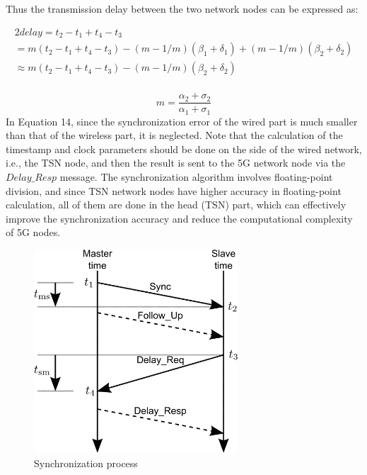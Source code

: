 \documentclass[english]{cccconf}
\begin{document}
Thus the transmission delay between the two network nodes can be expressed as:

	\begin{equation}
		\begin{gathered}
			2  delay =t_{2}-t_{1}+t_{4}-t_{3} \\
			=m\left(t_{2}-t_{1}+t_{4}-t_{3}\right)-(m-1 / m)\left(\beta_{1}+\delta_{1}\right)+(m-1 / m)\left(\beta_{2}+\delta_{2}\right) \\
			 \approx m\left(t_{2}-t_{1}+t_{4}-t_{3}\right)-(m-1 / m)\left(\beta_{2}+\delta_{2}\right)\\
		\end{gathered}
	\end{equation}

\begin{equation}
		m=\frac{\alpha_{2}+\sigma_{2}}{\alpha_{1}+\sigma_{1}}		
\end{equation}
In Equation 14, since the synchronization error of the wired part is much smaller than that of the wireless part, it is neglected.
Note that the calculation of the timestamp and clock parameters should be done on the side of the wired network, i.e., the TSN node, and then the result is sent to the 5G network node via the $Delay\_Resp$ message. The synchronization algorithm involves floating-point division, and since TSN network nodes have higher accuracy in floating-point calculation, all of them are done in the head (TSN) part, which can effectively improve the synchronization accuracy and reduce the computational complexity of 5G nodes.

\begin{figure}[htbp]
	\centering
	\setcounter{figure}{3}
	\includegraphics[width=3in]{fig10.png}
	\caption{Synchronization process}
\end{figure}
\end{document}
